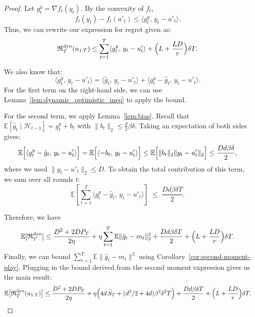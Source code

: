 \documentclass[journal,onecolumn]{IEEEtran}
\theoremstyle{plain}
\theoremstyle{definition}
\theoremstyle{remark}
\newcommand{\regret}{\mathfrak{R}}
\begin{document}
{\begin{proof}
    Let $g_{t}^{y} = \nabla f_{t}(y_{t})$. By the convexity of $f_{t}$,
    \begin{equation*}
        f_{t}(y_{t})-f_{t}(u'_{t}) \le \langle g_{t}^{y},\, y_{t}-u'_{t} \rangle.
    \end{equation*}
    Thus, we can rewrite our expression for regret given as:
    \begin{equation*}
        \regret^{\mathrm{dyn}}_{T}(u_{1:T}) \le\sum_{t=1}^{T} \langle g_{t}^{y},\,
        y_{t}-u'_{t} \rangle +\Bigl(L+\frac{LD}{r}\Bigr)\delta T.
    \end{equation*}

    We also know that:
    \begin{equation*}
        \langle g_{t}^{y},\, y_{t}-u'_{t} \rangle =\langle \hat g_{t},\, y_{t}-u'
        _{t} \rangle +\langle g_{t}^{y}-\hat g_{t},\, y_{t}-u'_{t} \rangle.
    \end{equation*}
    For the first term on the right-hand side, we can use Lemma~\ref{lem:dynamic_optimistic_ineq} to apply the bound. 

    For the second term, we apply Lemma~\ref{lem:bias}. Recall that $\mathbb{E}[\hat
    g_{t} \mid \mathcal{H}_{t-1}] = g_{t}^{y} + b_{t}$ with $\|b_{t}\|_{2} \le \frac{d}{2}
    \beta\delta$. Taking an expectation of both sides gives:
    \begin{equation*}
        \mathbb{E}\Bigl[\langle g_{t}^{y}-\hat g_{t},\, y_{t}-u'_{t} \rangle\Bigr] = \mathbb{E}\Bigl[\langle -b_{t},\, y_{t}-u'_{t} \rangle\Bigr] \le \mathbb{E}
        \Bigl[\|b_{t}\|_{2} \|y_{t}-u'_{t}\|_{2}\Bigr] \le \frac{Dd\beta\delta}{2},
    \end{equation*}
    where we used $\|y_{t}-u'_{t}\|_{2} \le D$. To obtain the total contribution of this term, we sum over all rounds $t$:
    \begin{equation}
        \mathbb{E}\left[\sum_{t=1}^{T} \langle g_{t}^{y}-\hat g_{t},\, y_{t}-u'_{t}
        \rangle\right] \;\le\; \frac{Dd\beta\delta T}{2}. \label{eq:dyn_bias_term}
    \end{equation}

    Therefore, we have
    \begin{equation*}
        \mathbb{E}[\regret^{\mathrm{dyn}}_{T}] \le\frac{D^{2}+2DP_{T}}{2\eta}+\eta
        \sum_{t=1}^{T} \mathbb{E}\|\hat g_{t}-m_{t}\|_{2}^{2} +\frac{Dd\beta\delta
        T}{2}+\Bigl(L+\frac{LD}{r}\Bigr)\delta T.
    \end{equation*}
    Finally, we can bound $\sum_{t=1}^{T}\mathbb{E}\|\hat g_{t}-m_{t}\|^{2}$ using Corollary~\ref{cor:second-moment-play}. Plugging in the bound derived from the second moment expression gives us the main result:
    \begin{align*}
        \mathbb{E}\bigl[\regret^{\mathrm{dyn}}_{T}(u_{1:T})\bigr] \le  \frac{D^{2}+ 2D P_{T}}{2\eta}+\eta \Bigl( 4d\,\bar{S}_{T}+ (d^{2}/2 + 4d)\beta^{2}\delta^{2}T \Bigr) \nonumber+\frac{D d \beta \delta T}{2}+ \Bigl( L + \frac{LD}{r}\Bigr) \delta T.
    \end{align*}


\end{proof}}
\end{document}
